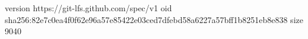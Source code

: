 version https://git-lfs.github.com/spec/v1
oid sha256:82e7c0ea4f0f62e96a57e85422e03ced7dfebd58a6227a57bff1b8251eb8e838
size 9040
